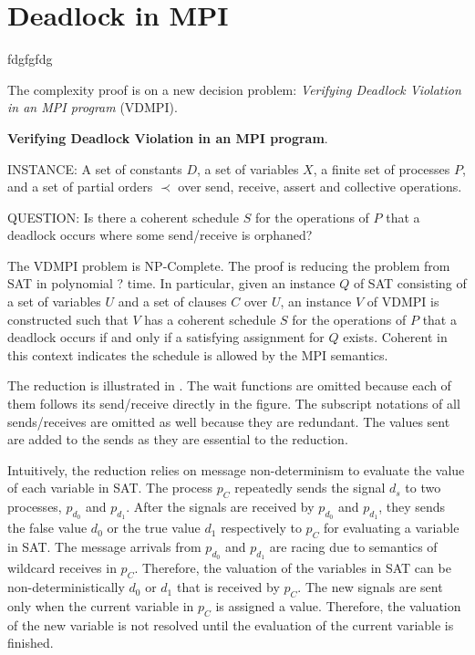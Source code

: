 \section{Deadlock in MPI}
fdgfgfdg

The complexity proof is on a
new decision problem: \emph{Verifying Deadlock Violation in an MPI program}
(VDMPI).
\begin{definition}
\textbf{Verifying Deadlock Violation in an MPI program}.
\begin{compactdesc}
\item{INSTANCE}: A set of constants $D$, a set of variables $X$, a finite set of processes $P$, and a
  set of partial orders $\prec$ over send, receive, assert and
  collective operations.
\item{QUESTION}: Is there a coherent schedule $S$ for the operations of $P$ that a deadlock occurs where some send/receive
is orphaned?
\end{compactdesc}
\label{def:np1}
\end{definition}


The VDMPI problem is NP-Complete. The proof is reducing the problem from SAT in polynomial ? time. In particular, given an instance $Q$ of SAT consisting of a set of variables $U$ and a set of clauses $C$ over $U$, an instance $V$ of VDMPI is constructed such that $V$ has a coherent schedule $S$ for the operations of $P$ that a deadlock occurs if and only if a satisfying assignment for $Q$ exists. Coherent in this context indicates the schedule is allowed by the MPI semantics.

The reduction is illustrated in . The wait functions are omitted because each of them follows its send/receive directly in the figure. The subscript notations of all sends/receives are omitted as well because they are redundant. The values sent are added to the sends as they are essential to the reduction. 

Intuitively, the reduction relies on message non-determinism to evaluate the value of each variable in SAT. The process $\mathit{p_C}$ repeatedly sends the signal $d_s$ to two processes, $\mathit{p_{d_0}}$ and $\mathit{p_{d_1}}$. After the signals are received by $\mathit{p_{d_0}}$ and $\mathit{p_{d_1}}$, they sends the false value $\mathit{d_0}$ or the true value $\mathit{d_1}$ respectively to $\mathit{p_{C}}$ for evaluating a variable in SAT. The message arrivals from $\mathit{p_{d_0}}$ and $\mathit{p_{d_1}}$ are racing due to semantics of wildcard receives in $\mathit{p_C}$. Therefore, the valuation of the variables in SAT can be non-deterministically $\mathit{d_0}$ or $\mathit{d_1}$ that is received by $\mathit{p_C}$. The new signals are sent only when the current variable in $\mathit{p_C}$ is assigned a value. Therefore, the valuation of the new variable is not resolved until the evaluation of the current variable is finished.

